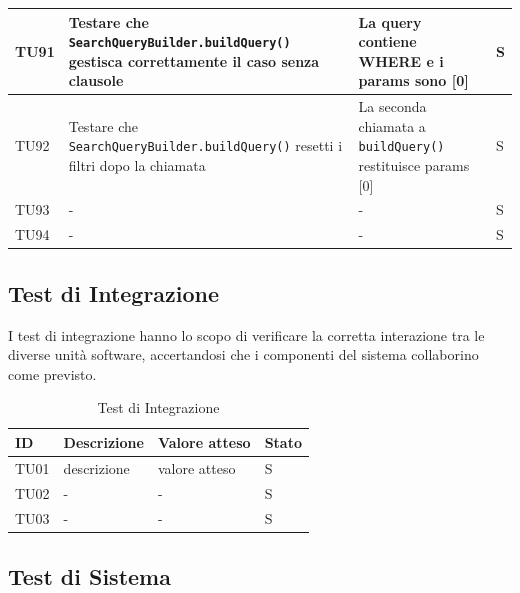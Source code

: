 \documentclass[a4paper,12pt]{article}
\begin{document}
\begin{longtable}{|M{1.2cm}|M{5cm}|M{5cm}|M{1.5cm}|}
            TU91 & Testare che \texttt{SearchQueryBuilder.buildQuery()} gestisca correttamente il caso senza clausole & La query contiene WHERE e i params sono [0] & S \\
            \hline

            TU92 & Testare che \texttt{SearchQueryBuilder.buildQuery()} resetti i filtri dopo la chiamata & La seconda chiamata a \texttt{buildQuery()} restituisce params [0] & S \\
            \hline

            TU93 & - & - & S \\
            \hline

            TU94 & - & - & S \\
            \hline

        \end{longtable}


        \subsection{Test di Integrazione}

        I test di integrazione hanno lo scopo di verificare la corretta interazione tra le diverse unità software, accertandosi che i componenti del sistema collaborino come previsto.

        \begin{longtable}{|M{1.2cm}|M{6.3cm}|M{2.5cm}|M{1.5cm}|}
                
            \caption{Test di Integrazione} \\
            \hline
            \textbf{ID} & \textbf{Descrizione} & \textbf{Valore atteso} & \textbf{Stato} \\
            \hline
            \endhead

            TU01 & descrizione & valore atteso & S \\
            \hline

            TU02 & - & - & S \\
            \hline

            TU03 & - & - & S \\
            \hline

        \end{longtable}


        \subsection{Test di Sistema}
\end{document}
